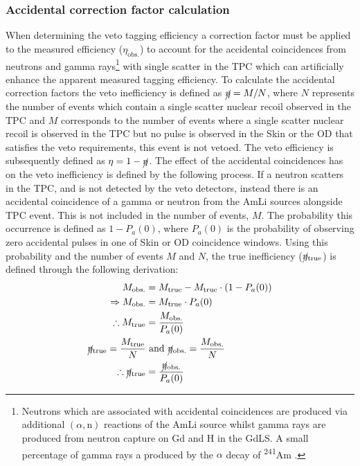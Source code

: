 \subsubsection{Accidental correction factor calculation}\label{sec:VetoEff/AmLiAccCorrection}
When determining the veto tagging efficiency a correction factor must be applied to the measured efficiency ($\eta_\text{obs.}$) to account for the accidental coincidences from neutrons and gamma rays\footnote{Neutrons which are associated with accidental coincidences are produced via additional $(\alpha,\text{n})$ reactions of the AmLi source whilst gamma rays are produced from neutron capture on Gd and H in the GdLS. A small percentage of gamma rays a produced by the $\alpha$ decay of \textsuperscript{241}Am \cite{Sazzad:2023uqs}.} with single scatter in the TPC which can artificially enhance the apparent measured tagging efficiency.
To calculate the accidental correction factors the veto inefficiency is defined as $\cancel{\eta}=M/N$, where $N$ represents the number of events which contain a single scatter nuclear recoil observed in the TPC and $M$ corresponds to the number of events where a single scatter nuclear recoil is observed in the TPC but no pulse is observed in the Skin or the OD that satisfies the veto requirements, this event is not vetoed.
The veto efficiency is subsequently defined as $\eta=1-\cancel{\eta}$.
The effect of the accidental coincidences has on the veto inefficiency is defined by the following process.
If a neutron scatters in the TPC, and is not detected by the veto detectors, instead there is an accidental coincidence of a gamma or neutron from the AmLi sources alongside TPC event. This is not included in the number of events, $M$.
The probability this occurrence is defined as $1-P_a(0)$, where $P_a(0)$ is the probability of observing zero accidental pulses in one of Skin or OD coincidence windows.
Using this probability and the number of events $M$ and $N$, the true inefficiency ($\cancel{\eta}_\text{true}$) is defined through the following derivation:
\label{eqn:Accidentals}
    \begin{align}
	M_\text{obs.}&=M_\text{true}-M_\text{true}\cdot(1-P_a(0))\\
	\Rightarrow M_\text{obs.}&=M_\text{true}\cdot P_a(0)\\
    \therefore M_\text{true}&=\frac{M_\text{obs.}}{P_a(0)}\\
	\cancel{\eta}_\text{true}=\frac{M_\text{true}}{N}&\text{ and }\cancel{\eta}_\text{obs.}=\frac{M_\text{obs.}}{N}\\
    \therefore \cancel{\eta}_\text{true}&=\frac{\cancel{\eta}_\text{obs.}}{P_a(0)}
    \end{align}
